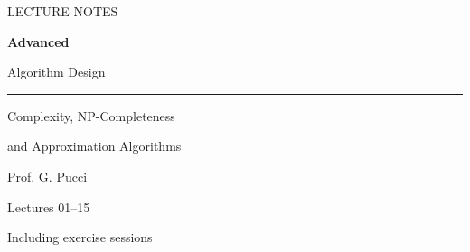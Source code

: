 \hypersetup{pageanchor=false}
\begin{titlepage}
  \centering
  \vspace*{30mm}
  {\large LECTURE NOTES\par}
  \vspace{14mm}
  {\fontsize{34}{42}\selectfont\bfseries Advanced\par Algorithm Design\par}
  \vspace{12mm}
  {\color{black!45}\rule{0.55\textwidth}{0.6pt}\par}
  \vspace{12mm}
  {\large Complexity, NP-Completeness\par and Approximation Algorithms\par}
  \vfill
  {\large Prof. G. Pucci\par}
  \vspace{5mm}
  {Lectures 01--15\par Including exercise sessions\par}
  \vspace*{20mm}
\end{titlepage}
\hypersetup{pageanchor=true}
\setcounter{tocdepth}{2}
\makeatletter
\renewcommand*\l@subsection{\@dottedtocline{2}{1.5em}{3.2em}}
\let\notes@tocpart\l@part
\renewcommand*\l@part[2]{\Needspace{8\baselineskip}\notes@tocpart{#1}{#2}}
\makeatother
\begingroup
\small
\setlength{\parskip}{0pt}
\tableofcontents
\endgroup
\clearpage
{}
